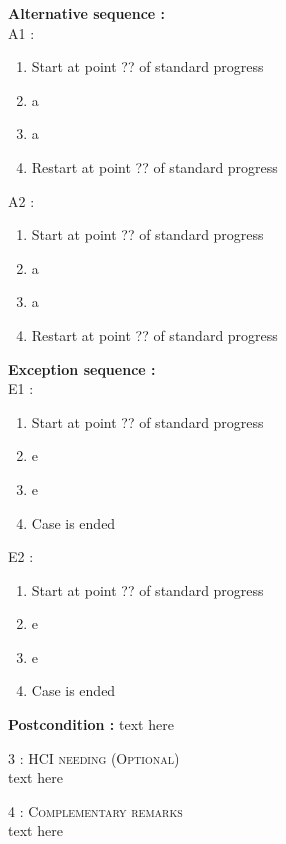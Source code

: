 \begin{flushleft}
    \textbf{\large  Alternative sequence :}\\
    A1 : 
    \begin{enumerate}[nosep]
        \item[] Start at point ?? of standard progress
        \item a	
        \item a	
        \item Restart at point ?? of standard progress
    \end{enumerate}


    A2 :
    \begin{enumerate}[nosep]
        \item[] Start at point ?? of standard progress
        \item a	
        \item a	
        \item Restart at point ?? of standard progress
    \end{enumerate}

    \textbf{\large  Exception sequence :}\\
    E1 :
    \begin{enumerate}[nosep]
        \item[] Start at point ?? of standard progress
        \item e
        \item e
        \item Case is ended
    \end{enumerate}
    E2 :
    \begin{enumerate}[nosep]
        \item[] Start at point ?? of standard progress
        \item e
        \item e
        \item Case is ended
    \end{enumerate}

    \textbf{\large Postcondition :} text here

    \BlackLine
    \textsc{\Large 3 : HCI needing (Optional)}\\[0.3cm]

    text here

    \BlackLine
    \textsc{\Large 4 : Complementary remarks}\\[0.3cm]

    text here	
\end{flushleft}
